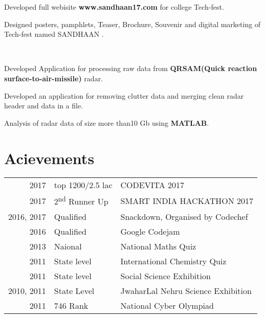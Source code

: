 \documentclass[a4paper]{manish-resume} %
\begin{document}
\begin{minipage}[t]{0.66\textwidth}
\begin{tightitemize}
\item Developed full webisite \textbf{www.sandhaan17.com}  for college Tech-fest.
\item Designed posters, pamphlets, Teaser, Brochure, Souvenir and digital marketing of Tech-fest named SANDHAAN .
\end{tightitemize}
\sectionspace
 \\

\begin{tightitemize}
\item Developed Application for processing  raw data from \textbf{ QRSAM(Quick reaction surface-to-air-missile)} radar.
\item Developed an application for removing clutter data and merging clean radar header and data in a file.
\item Analysis of radar data of size more than10 Gb using \textbf{MATLAB}.
\end{tightitemize}


\sectionspace %


\section{Acievements} 

\begin{tabular}{rll}
2017	 & top 1200/2.5 lac & CODEVITA 2017 \\
2017	 & 2\textsuperscript{nd} Runner Up &  SMART INDIA HACKATHON 2017\\
2016, 2017	 & Qualified & Snackdown, Organised by Codechef\\
2016	 & Qualified & Google Codejam\\
2013 & Naional & National Maths Quiz\\
2011 & State level& International Chemistry Quiz\\
2011 & State level & Social Science Exhibition \\
2010, 2011 & State Level & JwaharLal Nehru Science Exhibition\\
2011 & 746 Rank & National Cyber Olympiad\\
\end{tabular}


\end{minipage}
\end{document}
